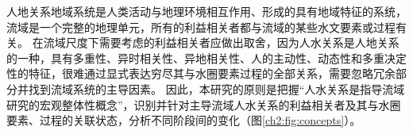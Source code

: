 



人地关系地域系统是人类活动与地理环境相互作用、形成的具有地域特征的系统\cite{tan2021}，流域是一个完整的地理单元，所有的利益相关者都与流域的某些水文要素或过程有关。
在流域尺度下需要考虑的利益相关者应做出取舍，因为人水关系是人地关系的一种，具有多重性、异时相关性、异地相关性、人的主动性、动态性和多重决定性的特征\cite{fang2004}，很难通过显式表达穷尽其与水圈要素过程的全部关系，需要忽略冗余部分并找到流域系统的主导因素。
因此，本研究的原则是把握“人水关系是指导流域研究的宏观整体性概念”，识别并针对主导流域人水关系的利益相关者及其与水圈要素、过程的关联状态，分析不同阶段间的变化（图\ref{ch2:fig:concepts}）。

